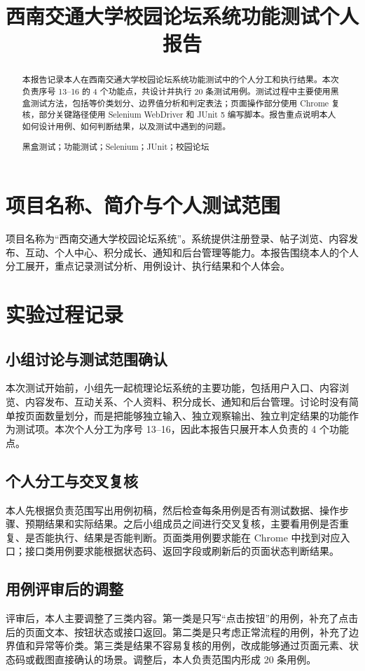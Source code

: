 \documentclass[bwprint]{report}
\title{西南交通大学校园论坛系统功能测试个人报告}
\begin{document}
\maketitle
\newpage
\pagestyle{plain}
\begin{abstract}
本报告记录本人在西南交通大学校园论坛系统功能测试中的个人分工和执行结果。本次负责序号 13--16 的 4 个功能点，共设计并执行 20 条测试用例。测试过程中主要使用黑盒测试方法，包括等价类划分、边界值分析和判定表法；页面操作部分使用 Chrome 复核，部分关键路径使用 Selenium WebDriver 和 JUnit 5 编写脚本。报告重点说明本人如何设计用例、如何判断结果，以及测试中遇到的问题。

黑盒测试；功能测试；Selenium；JUnit；校园论坛
\end{abstract}
\tableofcontents
\newpage
\setcounter{page}{1}

\section{项目名称、简介与个人测试范围}
项目名称为“西南交通大学校园论坛系统”。系统提供注册登录、帖子浏览、内容发布、互动、个人中心、积分成长、通知和后台管理等能力。本报告围绕本人的个人分工展开，重点记录测试分析、用例设计、执行结果和个人体会。


\section{实验过程记录}
\subsection{小组讨论与测试范围确认}
本次测试开始前，小组先一起梳理论坛系统的主要功能，包括用户入口、内容浏览、内容发布、互动关系、个人资料、积分成长、通知和后台管理。讨论时没有简单按页面数量划分，而是把能够独立输入、独立观察输出、独立判定结果的功能作为测试项。本次个人分工为序号 13--16，因此本报告只展开本人负责的 4 个功能点。

\subsection{个人分工与交叉复核}
本人先根据负责范围写出用例初稿，然后检查每条用例是否有测试数据、操作步骤、预期结果和实际结果。之后小组成员之间进行交叉复核，主要看用例是否重复、是否能执行、结果是否能判断。页面类用例要求能在 Chrome 中找到对应入口；接口类用例要求能根据状态码、返回字段或刷新后的页面状态判断结果。

\subsection{用例评审后的调整}
评审后，本人主要调整了三类内容。第一类是只写“点击按钮”的用例，补充了点击后的页面文本、按钮状态或接口返回。第二类是只考虑正常流程的用例，补充了边界值和异常等价类。第三类是结果不容易复核的用例，改成能够通过页面元素、状态码或截图直接确认的场景。调整后，本人负责范围内形成 20 条用例。
\end{document}
